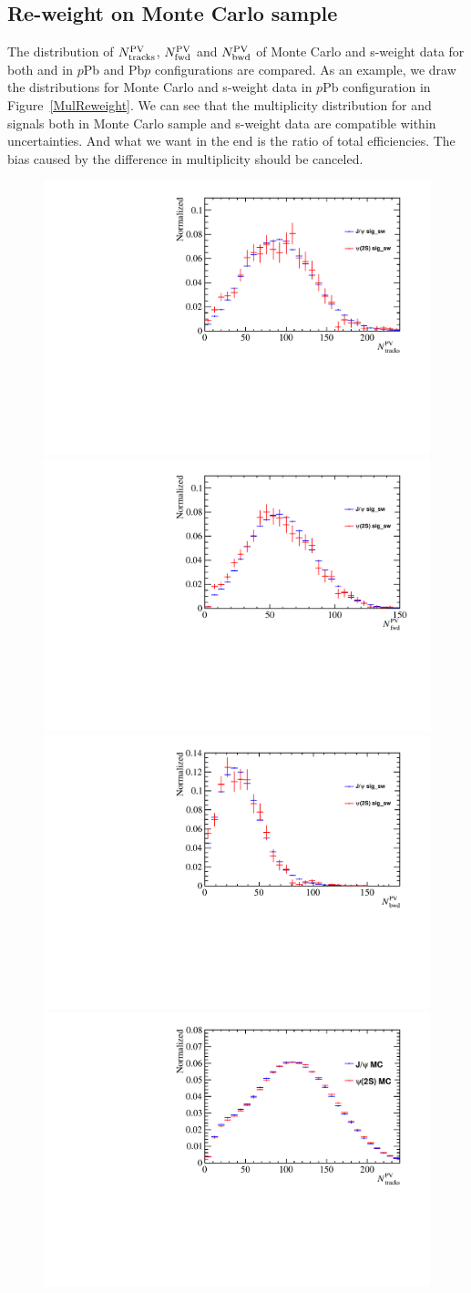 \subsection{Re-weight on Monte Carlo sample}
The distribution of $N_{\rm tracks}^{\rm PV}$, $N_{\rm fwd}^{\rm PV}$ and $N_{\rm bwd}^{\rm PV}$ of Monte Carlo and s-weight data for both \jpsi and \psitwos in $p$Pb and Pb$p$ configurations are compared. As an example, we draw the distributions for Monte Carlo and s-weight data in $p$Pb configuration in Figure~\ref{MulReweight}. We can see that the multiplicity distribution for \jpsi and \psitwos signals both in Monte Carlo sample and s-weight data are compatible within uncertainties. And what we want in the end is the ratio of total efficiencies. The bias caused by the difference in multiplicity should be canceled.
\begin{figure}[H]
\begin{center}
\includegraphics[width=0.32\linewidth]{pdf/pPb/Workdir/Reweight/sWeightMul.pdf}
\includegraphics[width=0.32\linewidth]{pdf/pPb/FWorkdir/Reweight/sWeightMul.pdf}
\includegraphics[width=0.32\linewidth]{pdf/pPb/BWorkdir/Reweight/sWeightMul.pdf}
\includegraphics[width=0.32\linewidth]{pdf/pPb/Workdir/Reweight/MCMul.pdf}

\end{center}
\end{figure}
